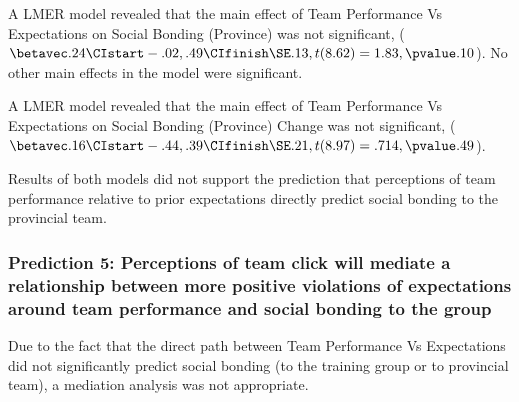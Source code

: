 \begin{CJK}{UTF8}{gbsn}

A LMER model revealed that the main effect of Team Performance Vs Expectations on Social Bonding (Province) was not significant, ($\betavec .24 \CIstart -.02, .49 \CIfinish \SE .13, t(8.62) = 1.83, \pvalue .10$). No other main effects in the model were significant.

 A LMER model revealed that the main effect of Team Performance Vs Expectations on Social Bonding (Province) Change was not significant, ($\betavec .16 \CIstart -.44, .39 \CIfinish \SE .21, t(8.97) = .714, \pvalue .49$).

Results of both models did not support the prediction that perceptions of team performance relative to prior expectations directly predict social bonding to the provincial team.



\subsubsection{Prediction 5: Perceptions of team click will mediate a relationship between more positive violations of expectations around team performance and social bonding to the group}

Due to the fact that the direct path between Team Performance Vs Expectations did not significantly predict social bonding (to the training group or to provincial team), a mediation analysis was not appropriate.




































\clearpage

\end{CJK}
